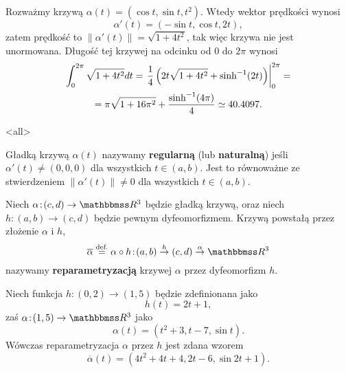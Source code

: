 \begin{frame}[<+->]

\begin{przyklad}
Rozważmy krzywą $\alpha(t)=(\cos{t},\sin{t},t^2)$. Wtedy wektor prędkości wynosi 
\[\alpha'(t)=(-\sin{t},\cos{t},2t),\]
zatem prędkość to 
$\|\alpha'(t)\|=\sqrt{1+4t^2}$, tak więc krzywa nie jest unormowana. Długość tej krzywej na odcinku od $0$ do $2\pi$ wynosi
\begin{multline*}
\int_{0}^{2\pi}\sqrt{1+4t^2} dt=\left.\frac{1}{4}\left( 2 t \sqrt{1+4 t^2}+\sinh^{-1}(2t)\right)\right|_{0}^{2\pi}=\\
=\pi \sqrt{1+16 \pi^2}+\frac{\sinh^{-1}(4 \pi)}{4}\simeq 40.4097.
\end{multline*}
\end{przyklad}

\end{frame}
\mode<all>{}
\begin{frame}[<+->]
\begin{definicja}
Gładką krzywą $\alpha(t)$ nazywamy \textbf{regularną} (lub \textbf{naturalną}) jeśli $\alpha'(t)\neq (0,0,0)$ dla wszystkich $t\in (a,b)$. Jest to równoważne ze stwierdzeniem $\|\alpha'(t)\|\neq 0$ dla wszystkich $t\in (a,b)$.
\end{definicja}

\begin{definicja}
Niech $\alpha\colon (c,d)\to \R^3$ będzie gładką krzywą, oraz niech $h\colon (a,b)\to (c,d)$ będzie pewnym dyfeomorfizmem. Krzywą powstałą przez złożenie $\alpha$ i $h$,\[\overline{\alpha}\define \alpha\circ h\colon (a,b)\top{h}(c,d)\top{\alpha}\R^3\]
nazywamy \textbf{reparametryzacją} krzywej $\alpha$ przez dyfeomorfizm $h$.
\end{definicja}
\end{frame}
\begin{frame}[<+->]


\begin{przyklad}
Niech funkcja $h\colon (0,2)\to (1,5)$ będzie zdefinionana jako \[h(t)=2t+1,\] zaś $\alpha\colon (1,5)\to\R^3$ jako \[\alpha(t)=(t^2+3,t-7,\sin{t}).\] Wówczas reparametryzacja $\alpha$ przez $h$ jest zdana wzorem
\[\overline{\alpha}(t)=(4t^2+4t+4,2t-6,\sin2t+1).\]
\end{przyklad}

\end{frame}

